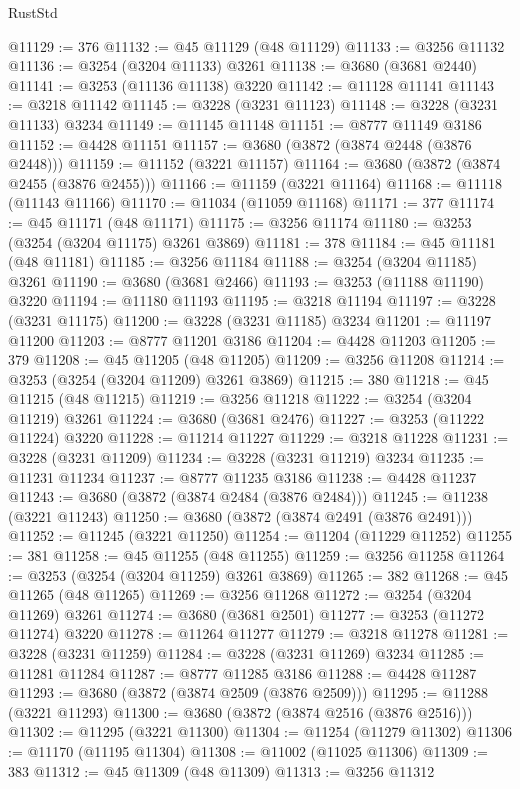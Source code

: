 \begin{lexlean}{RustStd}
\begin{coremodule}
@11129 := 376
@11132 := @45 @11129 (@48 @11129)
@11133 := @3256 @11132
@11136 := @3254 (@3204 @11133) @3261
@11138 := @3680 (@3681 @2440)
@11141 := @3253 (@11136 @11138) @3220
@11142 := @11128 @11141
@11143 := @3218 @11142
@11145 := @3228 (@3231 @11123)
@11148 := @3228 (@3231 @11133) @3234
@11149 := @11145 @11148
@11151 := @8777 @11149 @3186
@11152 := @4428 @11151
@11157 := @3680 (@3872 (@3874 @2448 (@3876 @2448)))
@11159 := @11152 (@3221 @11157)
@11164 := @3680 (@3872 (@3874 @2455 (@3876 @2455)))
@11166 := @11159 (@3221 @11164)
@11168 := @11118 (@11143 @11166)
@11170 := @11034 (@11059 @11168)
@11171 := 377
@11174 := @45 @11171 (@48 @11171)
@11175 := @3256 @11174
@11180 := @3253 (@3254 (@3204 @11175) @3261 @3869)
@11181 := 378
@11184 := @45 @11181 (@48 @11181)
@11185 := @3256 @11184
@11188 := @3254 (@3204 @11185) @3261
@11190 := @3680 (@3681 @2466)
@11193 := @3253 (@11188 @11190) @3220
@11194 := @11180 @11193
@11195 := @3218 @11194
@11197 := @3228 (@3231 @11175)
@11200 := @3228 (@3231 @11185) @3234
@11201 := @11197 @11200
@11203 := @8777 @11201 @3186
@11204 := @4428 @11203
@11205 := 379
@11208 := @45 @11205 (@48 @11205)
@11209 := @3256 @11208
@11214 := @3253 (@3254 (@3204 @11209) @3261 @3869)
@11215 := 380
@11218 := @45 @11215 (@48 @11215)
@11219 := @3256 @11218
@11222 := @3254 (@3204 @11219) @3261
@11224 := @3680 (@3681 @2476)
@11227 := @3253 (@11222 @11224) @3220
@11228 := @11214 @11227
@11229 := @3218 @11228
@11231 := @3228 (@3231 @11209)
@11234 := @3228 (@3231 @11219) @3234
@11235 := @11231 @11234
@11237 := @8777 @11235 @3186
@11238 := @4428 @11237
@11243 := @3680 (@3872 (@3874 @2484 (@3876 @2484)))
@11245 := @11238 (@3221 @11243)
@11250 := @3680 (@3872 (@3874 @2491 (@3876 @2491)))
@11252 := @11245 (@3221 @11250)
@11254 := @11204 (@11229 @11252)
@11255 := 381
@11258 := @45 @11255 (@48 @11255)
@11259 := @3256 @11258
@11264 := @3253 (@3254 (@3204 @11259) @3261 @3869)
@11265 := 382
@11268 := @45 @11265 (@48 @11265)
@11269 := @3256 @11268
@11272 := @3254 (@3204 @11269) @3261
@11274 := @3680 (@3681 @2501)
@11277 := @3253 (@11272 @11274) @3220
@11278 := @11264 @11277
@11279 := @3218 @11278
@11281 := @3228 (@3231 @11259)
@11284 := @3228 (@3231 @11269) @3234
@11285 := @11281 @11284
@11287 := @8777 @11285 @3186
@11288 := @4428 @11287
@11293 := @3680 (@3872 (@3874 @2509 (@3876 @2509)))
@11295 := @11288 (@3221 @11293)
@11300 := @3680 (@3872 (@3874 @2516 (@3876 @2516)))
@11302 := @11295 (@3221 @11300)
@11304 := @11254 (@11279 @11302)
@11306 := @11170 (@11195 @11304)
@11308 := @11002 (@11025 @11306)
@11309 := 383
@11312 := @45 @11309 (@48 @11309)
@11313 := @3256 @11312

\end{coremodule}
\end{lexlean}
